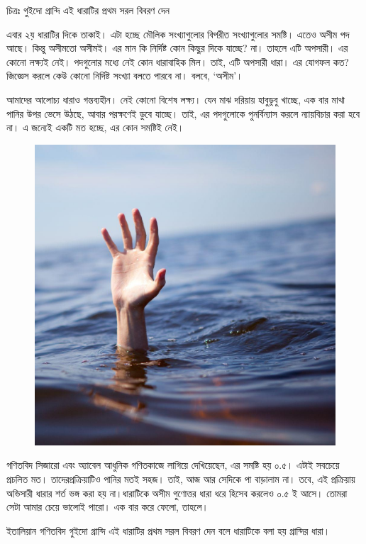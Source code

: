 \documentclass[
]{book}
\begin{document}
চিত্রঃ গুইদো গ্রান্দি এই ধারাটির প্রথম সরল বিবরণ দেন

এবার ২য় ধারাটির দিকে তাকাই। এটা হচ্ছে মৌলিক সংখ্যাগুলোর বিপরীত সংখ্যাগুলোর সমষ্টি। এতেও অসীম পদ আছে। কিন্তু অসীমতো অসীমই। এর মান কি নির্দিষ্ট কোন কিছুর দিকে যাচ্ছে? না। তাহলে এটি অপসারী। এর কোনো লক্ষ্যই নেই। পদগুলোর মধ্যে নেই কোন ধারাবাহিক মিল। তাই, এটি অপসারী ধারা। এর যোগফল কত? জিজ্ঞেস করলে কেউ কোনো নির্দিষ্ট সংখ্যা বলতে পারবে না। বলবে, `অসীম'।

আমাদের আলোচ্য ধারাও গন্তব্যহীন। নেই কোনো বিশেষ লক্ষ্য। যেন মাঝ দরিয়ায় হাবুডুবু খাচ্ছে, এক বার মাথা পানির উপর ভেসে উঠছে, আবার পরক্ষণেই ডুবে যাচ্ছে। তাই, এর পদগুলোকে পুনর্বিন্যাস করলে ন্যায়বিচার করা হবে না। এ জন্যেই একটি মত হচ্ছে, এর কোন সমষ্টিই নেই।

\begin{figure}

{\centering \includegraphics[width=0.8\linewidth]{img/drowning} 

}

\end{figure}

গণিতবিদ সিজারো এবং অ্যাবেল আধুনিক গণিতকাজে লাগিয়ে দেখিয়েছেন, এর সমষ্টি হয় ০.৫। এটাই সবচেয়ে প্রচলিত মত। তাদেরপ্রক্রিয়াটিও পানির মতই সহজ। তাই, আজ আর সেদিকে পা বাড়ালাম না। তবে, এই প্রক্রিয়ায় অভিসারী ধারার শর্ত ভঙ্গ করা হয় না।ধারাটিকে অসীম গুণোত্তর ধারা ধরে হিসেব করলেও ০.৫ ই আসে। তোমরা সেটা আমার চেয়ে ভালোই পারো। এক বার করে ফেলো, তাহলে।

ইতালিয়ান গণিতবিদ গুইদো গ্রান্দি এই ধারাটির প্রথম সরল বিবরণ দেন বলে ধারাটিকে বলা হয় গ্রান্দির ধারা।

  
\end{document}
